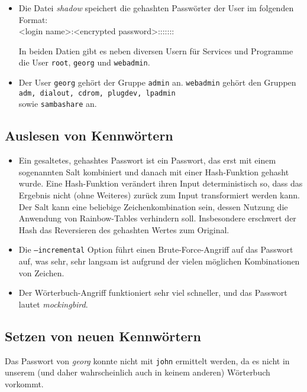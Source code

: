 \documentclass[10pt,a4paper]{article}
\begin{document}
\begin{itemize}
\begin{itemize}
\end{itemize}

\item Die Datei \textit{shadow} speichert die gehashten Passwörter der User im folgenden Format:\\
<login name>:<encrypted password>:::::::

In beiden Datien gibt es neben diversen Usern für Services und Programme die User \texttt{root}, \texttt{georg} und \texttt{webadmin}.

\item Der User \texttt{georg} gehört der Gruppe \texttt{admin} an. \texttt{webadmin} gehört den Gruppen \texttt{adm, dialout, cdrom, plugdev, lpadmin} \\  sowie \texttt{sambashare} an.
\end{itemize}

\subsection{Auslesen von Kennwörtern}
\begin{itemize}
\item Ein gesaltetes, gehashtes Passwort ist ein Passwort, das erst mit einem sogenannten Salt kombiniert und danach mit einer Hash-Funktion gehasht wurde. Eine Hash-Funktion verändert ihren Input deterministisch so, dass das Ergebnis nicht (ohne Weiteres) zurück zum Input transformiert werden kann. Der Salt kann eine beliebige Zeichenkombination sein, dessen Nutzung die Anwendung von Rainbow-Tables verhindern soll. Insbesondere erschwert der Hash das Reversieren des gehashten Wertes zum Original.
\item Die \texttt{---incremental} Option führt einen Brute-Force-Angriff auf das Passwort auf, was sehr, sehr langsam ist aufgrund der vielen möglichen Kombinationen von Zeichen.
\item Der Wörterbuch-Angriff funktioniert sehr viel schneller, und das Passwort lautet \textit{mockingbird}.
\end{itemize}

\subsection{Setzen von neuen Kennwörtern}
Das Passwort von \textit{georg} konnte nicht mit \texttt{john} ermittelt werden, da es nicht in unserem (und daher wahrscheinlich auch in keinem anderen) Wörterbuch vorkommt.
\end{document}
